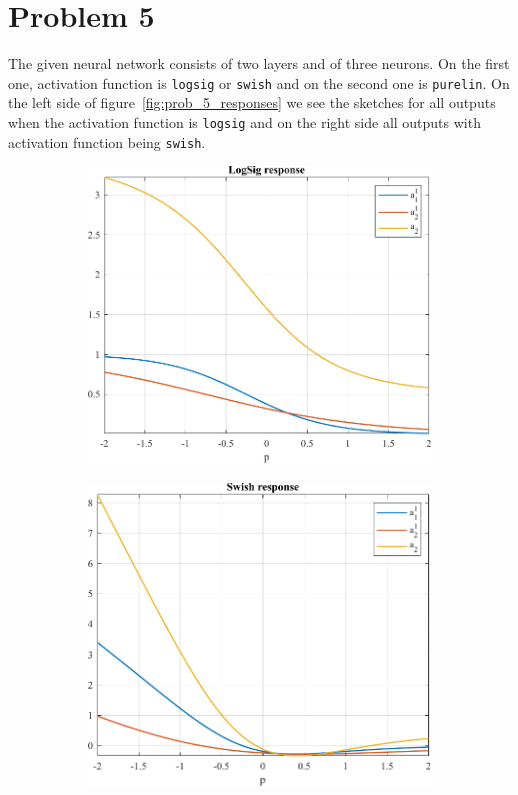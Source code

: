 \section{Problem 5}

The given neural network consists of two layers and of three neurons. On the first one, activation function is \verb*|logsig| or \verb*|swish| and on the second one is \verb*|purelin|. On the left side of figure~\ref{fig:prob_5_responses} we see the sketches for all outputs when the activation function is \verb*|logsig| and on the right side all outputs with activation function being \verb*|swish|.

\begin{figure}[H]
	\centering
	\begin{subfigure}{0.47\textwidth}
		\centering
		\caption{}
		\includegraphics[width=\textwidth]{../Problem 5/logsig_activation.pdf}
	\end{subfigure}
	\hspace{1mm}
	\begin{subfigure}{0.47\textwidth}
		\centering
		\caption{}
		\includegraphics[width=\textwidth]{../Problem 5/swish_activation.pdf}

\end{subfigure}
\end{figure}
